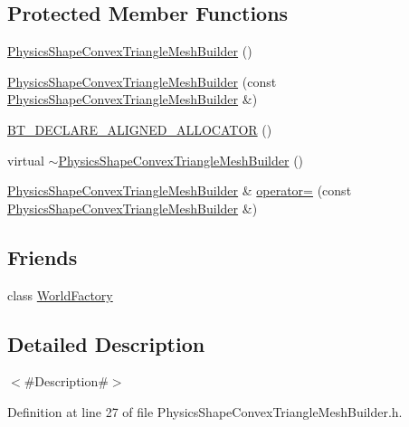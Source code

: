 \subsection*{Protected Member Functions}
\begin{DoxyCompactItemize}
\item 
\mbox{\hyperlink{classnjli_1_1_physics_shape_convex_triangle_mesh_builder_abbaf4a5c66782c2c50622ca5f30cd565}{Physics\+Shape\+Convex\+Triangle\+Mesh\+Builder}} ()
\item 
\mbox{\hyperlink{classnjli_1_1_physics_shape_convex_triangle_mesh_builder_a1ba186e194b042276128c8f8577df588}{Physics\+Shape\+Convex\+Triangle\+Mesh\+Builder}} (const \mbox{\hyperlink{classnjli_1_1_physics_shape_convex_triangle_mesh_builder}{Physics\+Shape\+Convex\+Triangle\+Mesh\+Builder}} \&)
\item 
\mbox{\hyperlink{classnjli_1_1_physics_shape_convex_triangle_mesh_builder_a1f3db8693ea32f7d3c00dbbc95854a11}{B\+T\+\_\+\+D\+E\+C\+L\+A\+R\+E\+\_\+\+A\+L\+I\+G\+N\+E\+D\+\_\+\+A\+L\+L\+O\+C\+A\+T\+OR}} ()
\item 
virtual \mbox{\hyperlink{classnjli_1_1_physics_shape_convex_triangle_mesh_builder_abc50a6c14cb2acb504982543ac63d43b}{$\sim$\+Physics\+Shape\+Convex\+Triangle\+Mesh\+Builder}} ()
\item 
\mbox{\hyperlink{classnjli_1_1_physics_shape_convex_triangle_mesh_builder}{Physics\+Shape\+Convex\+Triangle\+Mesh\+Builder}} \& \mbox{\hyperlink{classnjli_1_1_physics_shape_convex_triangle_mesh_builder_ae1b7f1e588a09a5ad8b3fba70dda119c}{operator=}} (const \mbox{\hyperlink{classnjli_1_1_physics_shape_convex_triangle_mesh_builder}{Physics\+Shape\+Convex\+Triangle\+Mesh\+Builder}} \&)
\end{DoxyCompactItemize}
\subsection*{Friends}
\begin{DoxyCompactItemize}
\item 
class \mbox{\hyperlink{classnjli_1_1_physics_shape_convex_triangle_mesh_builder_acb96ebb09abe8f2a37a915a842babfac}{World\+Factory}}
\end{DoxyCompactItemize}


\subsection{Detailed Description}
$<$\#\+Description\#$>$ 

Definition at line 27 of file Physics\+Shape\+Convex\+Triangle\+Mesh\+Builder.\+h.



